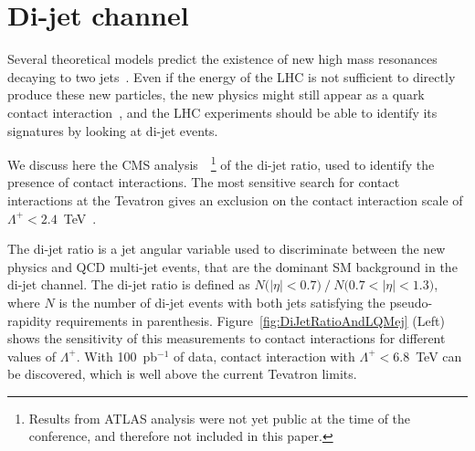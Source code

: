 \documentclass{cimento}
\begin{document}
\section{Di-jet channel} \label{dijet}
Several theoretical models predict the existence of new 
high mass resonances decaying to two 
jets~\cite{Baur:1989kv,Bagger:1987fz,Angelopoulos:1986uq}.
Even if the energy of the LHC is not sufficient to directly produce 
these new particles, the new physics might still appear as 
a quark contact interaction~\cite{Eichten:1983hw}, 
and the LHC experiments should 
be able to identify its signatures by looking at di-jet events.

We discuss here the CMS analysis~\cite{DIJETSNOTE}~\footnote{Results 
from ATLAS analysis were not yet public at the time 
of the conference, and therefore not included in this paper.}
of the di-jet ratio, used to identify the presence of contact interactions. 
The most sensitive search for contact interactions at the Tevatron 
gives an exclusion on the contact interaction scale 
of $\Lambda^{+} < 2.4$~TeV~\cite{Abbott:1998wh}.  

The di-jet ratio is a jet angular variable used to 
discriminate between the new physics and QCD multi-jet events, 
that are the dominant SM background in the di-jet channel. The di-jet ratio is 
defined as $N\mbox{(}|\eta|<0.7\mbox{)}~/~N\mbox{(}0.7<|\eta|< 1.3 \mbox{)}$, 
where $N$ is the number of di-jet events with both jets satisfying the 
pseudo-rapidity requirements in parenthesis. 
Figure~\ref{fig:DiJetRatioAndLQMej} (Left) shows the sensitivity of this 
measurements to contact interactions for different values of $\Lambda^{+}$. 
With 100~pb$^{-1}$ of data, contact interaction with
$\Lambda^{+} < 6.8$~TeV can be discovered, which is well above the 
current Tevatron limits.
 
\end{document}
